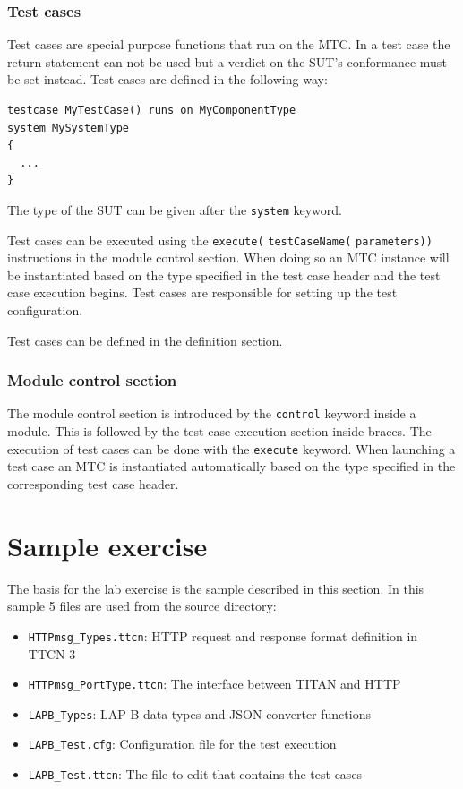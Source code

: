 \documentclass[a4paper]{article}
\begin{document}
\subsubsection{Test cases}
Test cases are special purpose functions that run on the MTC. In a test case the return statement can not be used but a
verdict on the SUT's conformance must be set instead. Test cases are defined in the following way:
{\footnotesize
\begin{lstlisting}
testcase MyTestCase() runs on MyComponentType
system MySystemType
{
  ...
}
\end{lstlisting}
}
The type of the SUT can be given after the \verb.system. keyword.

Test cases can be executed using the \verb/execute(/ \verb/testCaseName(/
\verb/parameters))/ instructions in the module control section. When doing so an MTC instance will be
instantiated based on the type specified in the test case header and the test case execution begins. Test cases are
responsible for setting up the test configuration.

Test cases can be defined in the definition section.

\subsubsection{Module control section}

The module control section is introduced by the \verb/control/ keyword inside a module. This is followed
by the test case execution section inside braces. The execution of test cases can be done with the
\verb/execute/ keyword. When launching a test case an MTC is instantiated automatically based on the type
specified in the corresponding test case header.


\section{Sample exercise}

The basis for the lab exercise is the sample described in this section. In this sample 5 files are used from the source directory:
\begin{itemize}
\item \verb/HTTPmsg_Types.ttcn/:  HTTP request and response format definition in TTCN-3
\item \verb/HTTPmsg_PortType.ttcn/: The interface between TITAN and HTTP
\item \verb!LAPB_Types!: LAP-B data types and JSON converter functions
\item \verb!LAPB_Test.cfg!: Configuration file for the test execution
\item \verb!LAPB_Test.ttcn!: The file to edit that contains the test cases
\end{itemize}
\end{document}
